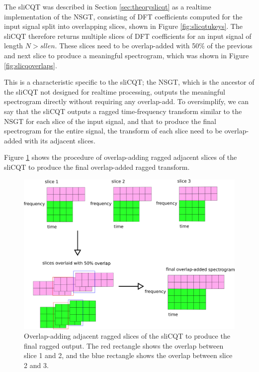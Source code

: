\documentclass[report.tex]{subfiles}
\begin{document}
The sliCQT was described in Section \ref{sec:theoryslicqt} as a realtime implementation of the NSGT, consisting of DFT coefficients computed for the input signal split into overlapping slices, shown in Figure \ref{fig:slicqtukeys}. The sliCQT therefore returns multiple slices of DFT coefficients for an input signal of length $N > sllen$. These slices need to be overlap-added with 50\% of the previous and next slice to produce a meaningful spectrogram, which was shown in Figure \ref{fig:slicqoverlaps}.

This is a characteristic specific to the sliCQT; the NSGT, which is the ancestor of the sliCQT not designed for realtime processing, outputs the meaningful spectrogram directly without requiring any overlap-add. To oversimplify, we can say that the sliCQT outputs a ragged time-frequency transform similar to the NSGT for each slice of the input signal, and that to produce the final spectrogram for the entire signal, the transform of each slice need to be overlap-added with its adjacent slices.

Figure \ref{fig:raggedslicqtoverlapadd} shows the procedure of overlap-adding ragged adjacent slices of the sliCQT to produce the final overlap-added ragged transform.

\begin{figure}[ht]
	\centering
	\includegraphics[width=\textwidth]{./images-blockdiagrams/overlapprocess.png}
	\caption{Overlap-adding adjacent ragged slices of the sliCQT to produce the final ragged output. The red rectangle shows the overlap between slice 1 and 2, and the blue rectangle shows the overlap between slice 2 and 3.}
	\label{fig:raggedslicqtoverlapadd}
\end{figure}
\end{document}
